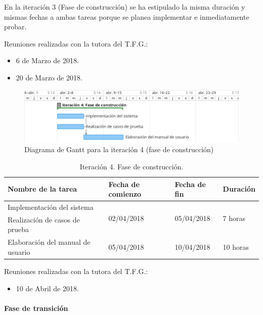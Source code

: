 \documentclass[twoside]{report}
\begin{document}
En la iteración 3 (Fase de construcción) se ha estipulado la misma duración y mismas fechas a ambas tareas porque se planea implementar e inmediatamente probar.

Reuniones realizadas con la tutora del T.F.G.:
\begin{itemize}
\item 6 de Marzo de 2018.
\item 20 de Marzo de 2018.
\end{itemize}


\begin{figure}[h]
\begin{center}
\includegraphics[width=\textwidth]{images/gantt/ite4}
\caption{Diagrama de Gantt para la iteración 4 (fase de construcción)}
\end{center}
\end{figure}

\begin{table}[H]
\centering
\begin{tabular}{|l|l|l|l|}
\hline
Nombre de la tarea                & Fecha de comienzo & Fecha de fin & Duración \\ \hline
Implementación del sistema        & \multirow{2}{*}{02/04/2018} & \multirow{2}{*}{05/04/2018}   & \multirow{2}{*}{7 horas}  \\
Realización de casos de prueba    & &   &   \\ \hline
Elaboración del manual de usuario & 05/04/2018        & 10/04/2018   & 10 horas   \\ \hline

\end{tabular}
\caption{Iteración 4. Fase de construcción.}
\end{table}

Reuniones realizadas con la tutora del T.F.G.:
\begin{itemize}
\item 10 de Abril de 2018.
\end{itemize}

\paragraph{Fase de transición}\mbox{}\\
\end{document}
